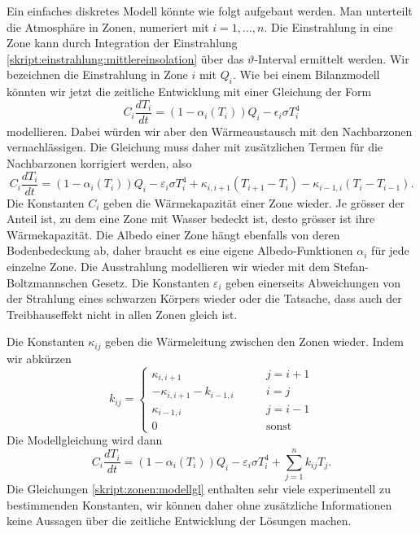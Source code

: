 Ein einfaches diskretes Modell könnte wie folgt aufgebaut werden.
Man unterteilt die Atmosphäre in Zonen, numeriert mit $i=1,\dots,n$.
Die Einstrahlung in eine Zone kann durch Integration der Einstrahlung
\eqref{skript:einstrahlung:mittlereinsolation}
über das $\vartheta$-Interval ermittelt werden.
Wir bezeichnen die Einstrahlung in Zone $i$ mit $Q_i$.
Wie bei einem Bilanzmodell könnten wir jetzt die zeitliche
Entwicklung mit einer Gleichung der Form
\[
C_i\frac{dT_i}{dt}
=
(1-\alpha_i(T_i)) Q_i - \epsilon_i \sigma T_i^4
\]
modellieren.
Dabei würden wir aber den Wärmeaustausch mit den Nachbarzonen
vernachlässigen.
Die Gleichung muss daher mit zusätzlichen Termen für die Nachbarzonen
korrigiert werden, also
\begin{equation}
C_i\frac{dT_i}{dt}
=
(1-\alpha_i(T_i)) Q_i - \varepsilon_i \sigma T_i^4
+
\kappa_{i,i+1} (T_{i+1}-T_i)
-
\kappa_{i-1,i} (T_i-T_{i-1}).
\end{equation}
Die Konstanten $C_i$ geben die Wärmekapazität einer Zone wieder.
Je grösser der Anteil ist, zu dem eine Zone mit Wasser bedeckt ist,
desto grösser ist ihre Wärmekapazität.
Die Albedo einer Zone hängt ebenfalls von deren Bodenbedeckung ab, 
daher braucht es eine eigene Albedo-Funktionen $\alpha_i$ für jede
einzelne Zone.
Die Ausstrahlung modellieren wir wieder mit dem Stefan-Boltzmannschen
Gesetz.
Die Konstanten $\varepsilon_i$ geben einerseits Abweichungen von
der Strahlung eines schwarzen Körpers wieder oder die Tatsache, dass
auch der Treibhauseffekt nicht in allen Zonen gleich ist.

Die Konstanten $\kappa_{ij}$ geben die Wärmeleitung zwischen den
Zonen wieder.
Indem wir abkürzen
\[
k_{ij}
=
\begin{cases}
\kappa_{i,i+1}&\qquad j=i+1
\\
-\kappa_{i,i+1}-k_{i-1,i}&\qquad i=j
\\
\kappa_{i-1,i}&\qquad j=i-1
\\
0&\qquad\text{sonst}
\end{cases}
\]
Die Modellgleichung wird dann
\begin{equation}
C_i \frac{dT_i}{dt}
=
(1-\alpha_i(T_i)) Q_i - \varepsilon_i \sigma T_i^4
+
\sum_{j=1}^n k_{ij}T_j.
\label{skript:zonen:modellgl}
\end{equation}
Die Gleichungen
\eqref{skript:zonen:modellgl}
enthalten sehr viele experimentell zu bestimmenden Konstanten,
wir können daher ohne zusätzliche Informationen keine Aussagen
über die zeitliche Entwicklung der Lösungen machen.



